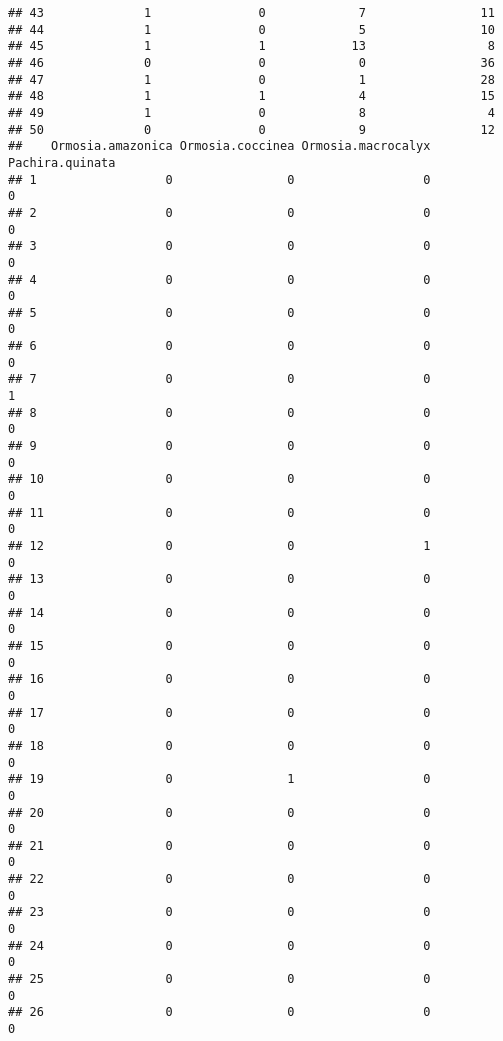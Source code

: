 \documentclass[
]{article}
\begin{document}
\begin{verbatim}
## 43              1               0             7                11
## 44              1               0             5                10
## 45              1               1            13                 8
## 46              0               0             0                36
## 47              1               0             1                28
## 48              1               1             4                15
## 49              1               0             8                 4
## 50              0               0             9                12
##    Ormosia.amazonica Ormosia.coccinea Ormosia.macrocalyx Pachira.quinata
## 1                  0                0                  0               0
## 2                  0                0                  0               0
## 3                  0                0                  0               0
## 4                  0                0                  0               0
## 5                  0                0                  0               0
## 6                  0                0                  0               0
## 7                  0                0                  0               1
## 8                  0                0                  0               0
## 9                  0                0                  0               0
## 10                 0                0                  0               0
## 11                 0                0                  0               0
## 12                 0                0                  1               0
## 13                 0                0                  0               0
## 14                 0                0                  0               0
## 15                 0                0                  0               0
## 16                 0                0                  0               0
## 17                 0                0                  0               0
## 18                 0                0                  0               0
## 19                 0                1                  0               0
## 20                 0                0                  0               0
## 21                 0                0                  0               0
## 22                 0                0                  0               0
## 23                 0                0                  0               0
## 24                 0                0                  0               0
## 25                 0                0                  0               0
## 26                 0                0                  0               0

\end{verbatim}
\end{document}
